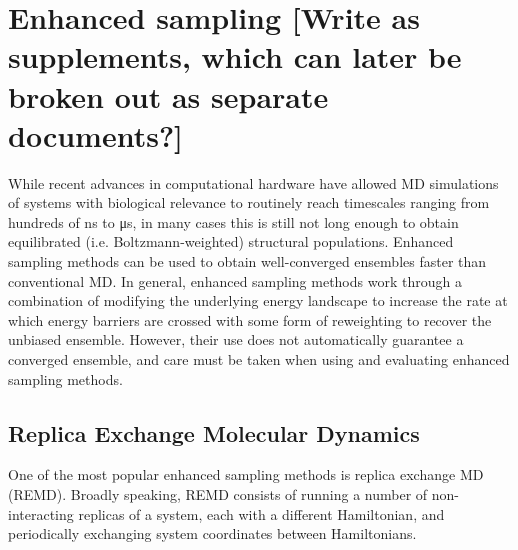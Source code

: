 \section{Enhanced sampling [Write as supplements, which can later be broken out as separate documents?]}
\label{sec:enhanced}

While recent advances in computational hardware have allowed MD simulations of systems with biological relevance to routinely reach timescales ranging from hundreds of \si{\nano\second} to \si{\micro\second}, in many cases this is still not long enough to obtain equilibrated (i.e. Boltzmann-weighted) structural populations. Enhanced sampling methods can be used to obtain well-converged ensembles faster than conventional MD. In general, enhanced sampling methods work through a combination of modifying the underlying energy landscape to increase the rate at which energy barriers are crossed with some form of reweighting to recover the unbiased ensemble. However, their use does not automatically guarantee a converged ensemble, and care must be taken when using and evaluating enhanced sampling methods.

\subsection{Replica Exchange Molecular Dynamics}
One of the most popular enhanced sampling methods is replica exchange MD (REMD).\citep{Sugita1999} Broadly speaking, REMD consists of running a number of non-interacting replicas of a system, each with a different Hamiltonian, and periodically exchanging system coordinates between Hamiltonians.

